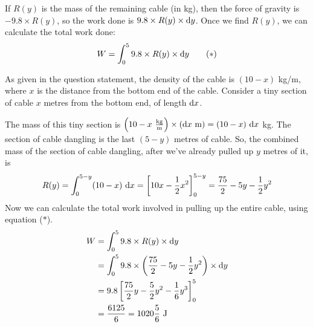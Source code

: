 \begin{solution}
\begin{description}
\begin{center}
\end{center}

 If $R(y)$ is the mass of the remaining cable (in kg), then the force of gravity is $-9.8 \times R(y)$, so the work done is $9.8 \times R(y) \times \mathrm{d}y$. Once we find $R(y)$, we can calculate the total work done:
\[W = \int _0 ^ 5 9.8 \times R(y) \times \mathrm{d}y \tag{$*$} \]

As given in the question statement, the density of the cable is $(10-x)$ kg/m, where $x$ is the distance from the bottom end of the cable. Consider a tiny section of cable $x$ metres from the bottom end, of length $\mathrm{d}x$.

\begin{center}
\end{center}

 The mass of this tiny section is $\left(10-x\ \frac{\text{kg}}{\text{m}}\right) \times \left(\mathrm{d}x\ \text{m}\right) = (10-x)\ \mathrm{d}x$ kg. The section of cable dangling is the last $(5-y)$ metres of cable. So, the combined mass of the section of cable dangling, after we've already pulled up $y$ metres of it, is
\[R(y) = \int_0^{5-y} (10-x)\ \mathrm{d}x =\left[10x - \frac{1}{2}x^2\right]_0^{5-y}=\frac{75}{2} -5y -\frac{1}{2} y^2\]
Now we can calculate the total work involved in pulling up the entire cable, using equation ($*$).
\begin{align*}
W &= \int _0 ^ 5 9.8 \times R(y) \times \mathrm{d}y \\
&=\int _0 ^ 5 9.8 \times \left(\frac{75}{2} -5y -\frac{1}{2}y^2\right) \times \mathrm{d}y\\
&=9.8\left[\frac{75}{2}y-\frac{5}{2}y^2-\frac{1}{6}y^3\right]_0^5\\
&=\frac{6125}{6}=1020\frac{5}{6} \text{ J}
\end{align*}


\end{description}
\end{solution}




